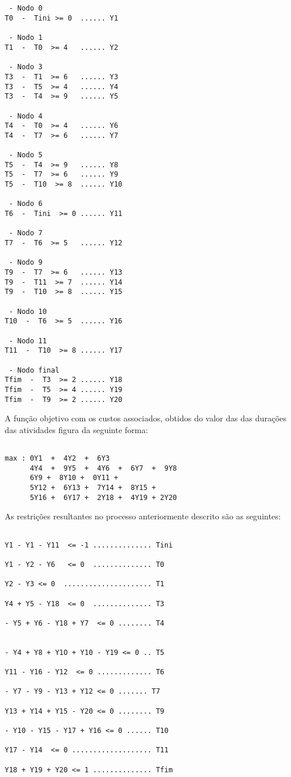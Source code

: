 \begin{verbatim}


 - Nodo 0
T0  -  Tini >= 0  ...... Y1

 - Nodo 1
T1  -  T0  >= 4   ...... Y2

 - Nodo 3
T3  -  T1  >= 6   ...... Y3
T3  -  T5  >= 4   ...... Y4
T3  -  T4  >= 9   ...... Y5

 - Nodo 4
T4  -  T0  >= 4   ...... Y6
T4  -  T7  >= 6   ...... Y7

 - Nodo 5
T5  -  T4  >= 9   ...... Y8
T5  -  T7  >= 6   ...... Y9
T5  -  T10  >= 8  ...... Y10

 - Nodo 6
T6  -  Tini  >= 0 ...... Y11

 - Nodo 7
T7  -  T6  >= 5   ...... Y12

 - Nodo 9
T9  -  T7  >= 6   ...... Y13
T9  -  T11  >= 7  ...... Y14
T9  -  T10  >= 8  ...... Y15

 - Nodo 10
T10  -  T6  >= 5  ...... Y16

 - Nodo 11
T11  -  T10  >= 8 ...... Y17

 - Nodo final
Tfim  -  T3  >= 2 ...... Y18
Tfim  -  T5  >= 4 ...... Y19
Tfim  -  T9  >= 2 ...... Y20

\end{verbatim}

A função objetivo com os custos associados, obtidos do valor das das durações
das atividades figura da seguinte forma:

\begin{verbatim}

max : 0Y1  +  4Y2  +  6Y3    
      4Y4  +  9Y5  +  4Y6  +  6Y7  +  9Y8 
      6Y9 +  8Y10 +  0Y11 +  
      5Y12 +  6Y13 +  7Y14 +  8Y15 +  
      5Y16 +  6Y17 +  2Y18 +  4Y19 + 2Y20 

\end{verbatim}

As restrições resultantes no processo anteriormente descrito são as seguintes:


\begin{verbatim}

Y1 - Y1 - Y11  <= -1 .............. Tini 

Y1 - Y2 - Y6   <= 0  .............. T0

Y2 - Y3 <= 0  ..................... T1

Y4 + Y5 - Y18  <= 0  .............. T3

- Y5 + Y6 - Y18 + Y7  <= 0 ........ T4


- Y4 + Y8 + Y1O + Y10 - Y19 <= 0 .. T5

Y11 - Y16 - Y12  <= 0 ............. T6

- Y7 - Y9 - Y13 + Y12 <= 0 ....... T7

Y13 + Y14 + Y15 - Y20 <= 0 ........ T9

- Y10 - Y15 - Y17 + Y16 <= 0 ...... T10

Y17 - Y14  <= 0 ................... T11

Y18 + Y19 + Y20 <= 1 .............. Tfim

\end{verbatim}

